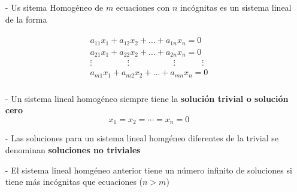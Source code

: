 \documentclass{article}
\begin{document}
\begin{tcolorbox}[colback=red!10!white, colframe=red!70!black, title=Resumen]
    \begin{itemize}
        \item[-] Us sitema Homogéneo de $m$ ecuaciones con $n$ incógnitas es un sistema lineal de la forma
        \item[] \begin{equation*}
            \begin{matrix}
                \begin{aligned}
                    a_{11}x_1 + a_{12}x_2 + \dots + a_{1n}x_n = 0\\
                    a_{21}x_1 + a_{22}x_2 + \dots + a_{2n}x_n = 0\\
                    \vdots \phantom{aaaaaaaa} \vdots \phantom{aaaaaaaaaa} \vdots \phantom{aaaaaa} \vdots\\
                    a_{m1}x_1 + a_{m2}x_2 + \dots + a_{mn}x_n = 0\\
                \end{aligned}
            \end{matrix}
        \end{equation*}

        \item[-] Un sistema lineal homogéneo siempre tiene la \textbf{solución trivial o solución cero} $$x_1 = x_2 = \dotsb = x_n = 0$$
        \item[-] Las soluciones para un sistema lineal homgéneo diferentes de la trivial se denominan \textbf{soluciones no triviales}
        \item[-] El sistema lineal homgéneo anterior tiene un número infinito de soluciones si tiene más incógnitas que ecuaciones ($n > m$)  
    \end{itemize}
\end{tcolorbox}
\end{document}
